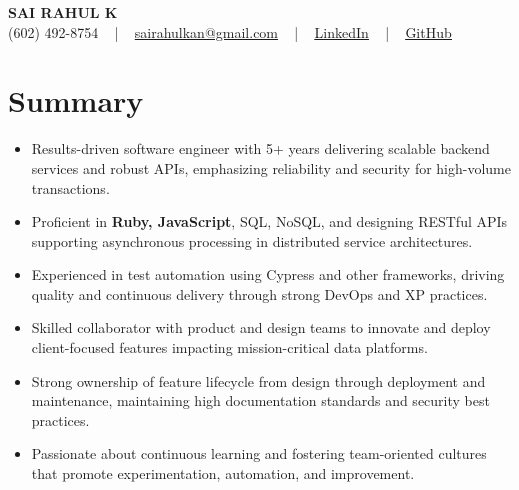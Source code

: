 \documentclass[letterpaper,11pt]{article}
\newcommand{\resumeItem}[1]{
  \item\footnotesize{
    {#1 \vspace{-2pt}}
  }
}
\newcommand{\resumeItemListStart}{\begin{itemize}[leftmargin=*]}
\newcommand{\resumeItemListEnd}{\end{itemize}\vspace{-5pt}}
\begin{document}
\begin{center}
    {\fontsize{14pt}{12pt}\selectfont \textbf{\MakeUppercase{Sai Rahul K}}}\\ \vspace{2pt}
    \fontsize{10pt}{12pt}\selectfont (602) 492-8754 ~ | ~ \href{mailto:sairahulkan@gmail.com}{sairahulkan@gmail.com} ~ | ~
    \href{https://www.linkedin.com/in/rq123/}{\color{blue}\underline{LinkedIn}} ~ | ~
    \href{https://github.com/kanrahuldo}{\color{blue}\underline{GitHub}}~
    \vspace{-8pt}
\end{center}

\section{Summary}
\fontsize{9pt}{10pt}\selectfont
\resumeItemListStart
    \resumeItem{Results-driven software engineer with 5+ years delivering scalable backend services and robust APIs, emphasizing reliability and security for high-volume transactions.} \vspace{-3pt}
    \resumeItem{Proficient in \textbf{Ruby, JavaScript}, SQL, NoSQL, and designing RESTful APIs supporting asynchronous processing in distributed service architectures.} \vspace{-3pt}
    \resumeItem{Experienced in test automation using Cypress and other frameworks, driving quality and continuous delivery through strong DevOps and XP practices.} \vspace{-3pt}
    \resumeItem{Skilled collaborator with product and design teams to innovate and deploy client-focused features impacting mission-critical data platforms.} \vspace{-3pt}
    \resumeItem{Strong ownership of feature lifecycle from design through deployment and maintenance, maintaining high documentation standards and security best practices.} \vspace{-3pt}
    \resumeItem{Passionate about continuous learning and fostering team-oriented cultures that promote experimentation, automation, and improvement.} \vspace{-3pt}
\resumeItemListEnd
\vspace{-6pt}
\end{document}
